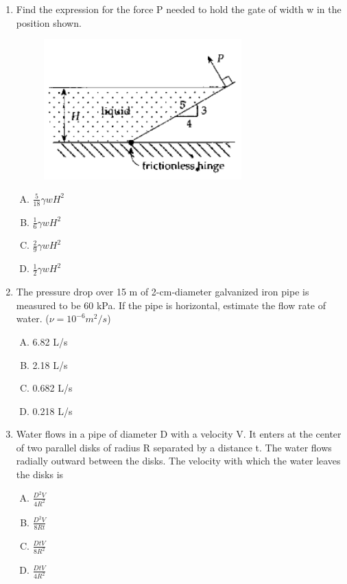 \documentclass[12pt]{article}
\begin{document}
\begin{enumerate}
\item Find the expression for the force P needed to hold the gate of width w in the position shown.

\begin{figure}[htbp] %
   \centering
   \includegraphics[width=3in]{gate.png} 
   \caption{}
   \label{fig:gate}
\end{figure}

\begin{enumerate}[A)]
\item $\frac{5}{18}\gamma w H^2$
\item $\frac{1}{6} \gamma w H^2$
\item $\frac{2}{9} \gamma w H^2$
\item $\frac{1}{2} \gamma w H^2$
\end{enumerate}

\item The pressure drop over 15 m of 2-cm-diameter galvanized iron pipe is measured
to be 60 kPa. If the pipe is horizontal, estimate the flow rate of water. ($\nu = 10^{-6}
m^2/s$)
\begin{enumerate}[A)]
\item 6.82 L/s
\item 2.18 L/s
\item 0.682 L/s
\item 0.218 L/s
\end{enumerate}

\item Water flows in a pipe of diameter D with a velocity V. It enters at the center of
two parallel disks of radius R separated by a distance t. The water flows radially
outward between the disks. The velocity with which the water leaves the disks is

\begin{enumerate}[A)]
\item $\frac{D^2V}{4R^2}$
\item $\frac{D^2V}{8Rt}$
\item $\frac{DtV}{8R^2}$
\item $\frac{DtV}{4R^2}$
\end{enumerate}


\end{enumerate}
\end{document}
